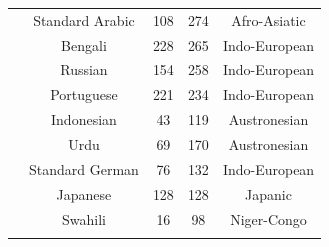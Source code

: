 {\begin{tabular}{|c|c|c|c|c|}
	\thetablecount\stepcounter{tablecount} &
Standard Arabic &
	

108 &
	

274 &
	

Afro-Asiatic \\

	\thetablecount\stepcounter{tablecount} &
Bengali &
	

228 &
	

265 &
	

Indo-European \\

	\thetablecount\stepcounter{tablecount} &
Russian &
	

154 &
	

258 &
	

Indo-European \\

	\thetablecount\stepcounter{tablecount} &
Portuguese &
	

221 &
	

234 &
	

Indo-European \\
	\thetablecount\stepcounter{tablecount} &

Indonesian &
	

43 &
	

119 &
	

Austronesian \\

	\thetablecount\stepcounter{tablecount} &
Urdu &
	

69 &
	

170 &
	

Austronesian \\
	\thetablecount\stepcounter{tablecount} &

Standard German &
	

76 &
	

132 &
	

Indo-European \\
	\thetablecount\stepcounter{tablecount} &

Japanese &
	

128 &
	

128 &
	

Japanic \\

	\thetablecount\stepcounter{tablecount} &
Swahili &
	

16 &
	

98 &
	

Niger-Congo \\
	\thetablecount\stepcounter{tablecount} &


\end{tabular}}
